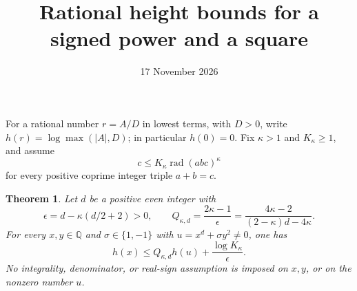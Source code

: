 \documentclass[11pt,a4paper]{article}
\title{Rational height bounds for a signed power and a square}
\author{}\date{17 November 2026}
\newtheorem{theorem}{Theorem}[section]
\newcommand{\Q}{\mathbb Q}\newcommand{\Z}{\mathbb Z}
\DeclareMathOperator{\rad}{rad}
\begin{document}
\maketitle

For a rational number $r=A/D$ in lowest terms, with $D>0$, write
$h(r)=\log\max(|A|,D)$; in particular $h(0)=0$.
Fix $\kappa>1$ and $K_\kappa\ge1$, and assume
\begin{equation}\label{eq:abc}
 c\le K_\kappa\rad(abc)^\kappa
\end{equation}
for every positive coprime integer triple $a+b=c$.

\begin{theorem}\label{thm:height}
Let $d$ be a positive even integer with
\[
 \epsilon=d-\kappa(d/2+2)>0,
 \qquad
 Q_{\kappa,d}=\frac{2\kappa-1}{\epsilon}
              =\frac{4\kappa-2}{(2-\kappa)d-4\kappa}.
\]
For every $x,y\in\Q$ and $\sigma\in\{1,-1\}$ with
$u=x^d+\sigma y^2\ne0$, one has
\begin{equation}\label{eq:bound}
 h(x)\le Q_{\kappa,d}h(u)+\frac{\log K_\kappa}{\epsilon}.
\end{equation}
No integrality, denominator, or real-sign assumption is imposed on
$x,y$, or on the nonzero number $u$.
\end{theorem}
\end{document}
